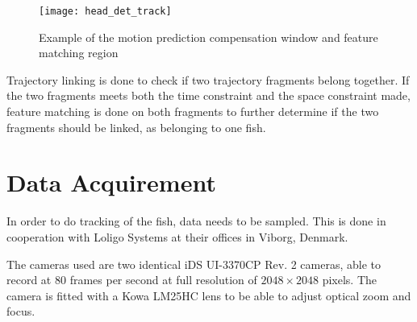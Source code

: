 \begin{figure}[H]
	\centering
	\texttt{[image: head\_det\_track]}
	\caption{Example of the motion prediction compensation window and feature matching region \citep{Qian2014}}
	\label{fig:head_det_track}
\end{figure}

Trajectory linking is done to check if two trajectory fragments belong together. If the two fragments meets both the time constraint and the space constraint made, feature matching is done on both fragments to further determine if the two fragments should be linked, as belonging to one fish.

\section{Data Acquirement}
In order to do tracking of the fish, data needs to be sampled. This is done in cooperation with Loligo Systems at their offices in Viborg, Denmark.

The cameras used are two identical iDS UI-3370CP Rev. 2 cameras, able to record at $80$ frames per second at full resolution of $ 2048\times2048 $ pixels. The camera is fitted with a Kowa LM25HC lens to be able to adjust optical zoom and focus. 